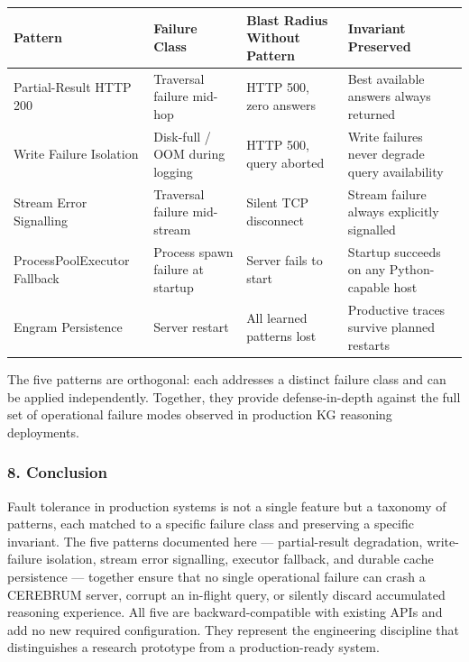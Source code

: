 \begin{center}
{\footnotesize
\begin{tabularx}{\columnwidth}{|>{\raggedright\arraybackslash}X|>{\raggedright\arraybackslash}X|>{\raggedright\arraybackslash}X|>{\raggedright\arraybackslash}X|}
\hline
Pattern & Failure Class & Blast Radius Without Pattern & Invariant Preserved \\ \hline
Partial-Result HTTP 200 & Traversal failure mid-hop & HTTP 500, zero answers & Best available answers always returned \\ \hline
Write Failure Isolation & Disk-full / OOM during logging & HTTP 500, query aborted & Write failures never degrade query avail\-ability \\ \hline
Stream Error Signalling & Traversal failure mid-stream & Silent TCP disconnect & Stream failure always explicitly signalled \\ \hline
ProcessPoolExecutor Fallback & Process spawn failure at startup & Server fails to start & Startup succeeds on any Python-capable host \\ \hline
Engram Persistence & Server restart & All learned patterns lost & Productive traces survive planned restarts \\ \hline
\end{tabularx}
}
\end{center}

The five patterns are orthogonal: each addresses a distinct failure class and can be applied indep\-endently. Together, they provide defense-in-depth against the full set of operational failure modes observed in production KG reasoning deployments.

\subsubsection{8. Conclusion}
Fault tolerance in production systems is not a single feature but a taxonomy of patterns, each matched to a specific failure class and preserving a specific invariant. The five patterns documented here — partial-result degradation, write-failure isolation, stream error signalling, executor fallback, and durable cache persistence — together ensure that no single operational failure can crash a CEREBRUM server, corrupt an in-flight query, or silently discard accumulated reasoning experience. All five are backward-compatible with existing APIs and add no new required confi\-guration. They represent the engineering discipline that disti\-nguishes a research prototype from a production-ready system.

